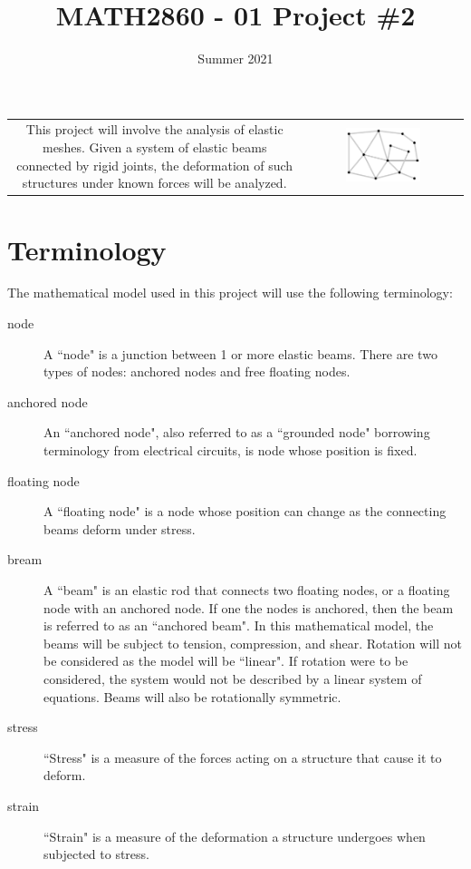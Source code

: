 \documentclass{article}
\title{MATH2860 - 01 Project \#2}
\date{Summer 2021}
\begin{document}
\maketitle

\begin{center}
\begin{tabular}{cc}
\parbox{0.5\textwidth}{
This project will involve the analysis of elastic meshes. Given a system of elastic beams connected by rigid joints, the deformation of such structures under known forces will be analyzed. 
} & \parbox{0.5\textwidth}{
\includegraphics[width = 0.5\textwidth]{elastic_mesh_example}
}
\end{tabular}
\end{center}



\section{Terminology}

The mathematical model used in this project will use the following terminology:

\begin{description}
\item[node] A ``node" is a junction between 1 or more elastic beams. There are two types of nodes: anchored nodes and free floating nodes.
\item[anchored node] An ``anchored node", also referred to as a ``grounded node" borrowing terminology from electrical circuits, is node whose position is fixed.
\item[floating node] A ``floating node" is a node whose position can change as the connecting beams deform under stress. 
\item[bream] A ``beam" is an elastic rod that connects two floating nodes, or a floating node with an anchored node. If one the nodes is anchored, then the beam is referred to as an ``anchored beam". In this mathematical model, the beams will be subject to tension, compression, and shear. Rotation will not be considered as the model will be ``linear". If rotation were to be considered, the system would not be described by a linear system of equations. Beams will also be rotationally symmetric.
\item[stress] ``Stress" is a measure of the forces acting on a structure that cause it to deform.    
\item[strain] ``Strain" is a measure of the deformation a structure undergoes when subjected to stress.
\end{description}
\end{document}
